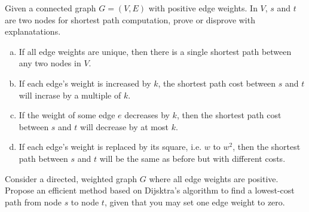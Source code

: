 \documentclass[12pt]{article}
\newenvironment{problem}[2][Problem]{\begin{trivlist}
\item[\hskip \labelsep {\bfseries #1}\hskip \labelsep {\bfseries #2.}]}{\end{trivlist}}
\begin{document}
\begin{problem}{4}
    Given a connected graph $G=(V,E)$ with positive edge weights. In $V$, $s$ and $t$ are two nodes for shortest path computation, prove or disprove with explanatations.
    \begin{enumerate}[(a)]
        \item If all edge weights are unique, then there is a single shortest path between any two nodes in $V$.
        \item If each edge's weight is increased by $k$, the shortest path cost between $s$ and $t$ will incrase by a multiple of $k$.
        \item If the weight of some edge $e$ decreases by $k$, then the shortest path cost between $s$ and $t$ will decrease by at most $k$.
        \item If each edge's weight is replaced by its square, i.e. $w$ to $w^2$, then the shortest path between $s$ and $t$ will be the same as before but with different costs.
    \end{enumerate}
\end{problem}
\begin{problem}{5}
    Consider a directed, weighted graph $G$ where all edge weights are positive. Propose an efficient method based on Dijsktra's algorithm to find a lowest-cost path from node $s$ to node $t$, given that you may set one edge weight to zero.
\end{problem}
\end{document}
